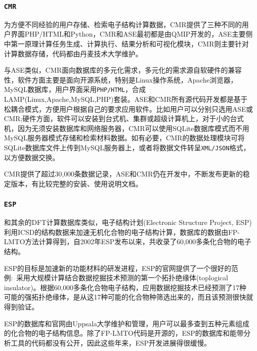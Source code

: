 \frame
{
\frametitle{\tt{CMR}}
为方便不同经验的用户存储、检索电子结构计算数据，\textrm{CMR}提供了三种不同的用户界面\textrm{PHP/HTML和Python}\cite{CMR_URL}，\textrm{CMR}和\textrm{ASE}最初都是由\textrm{QMIP}开发的\cite{CSE14-51_2012}，\textrm{ASE}主要侧中第一原理计算任务生成、计算执行、结果分析和可视化模块，\textrm{CMR}则主要针对计算数据存储，代码都由丹麦技术大学维护。

与\textrm{ASE}类似，\textrm{CMR}面向数据库的多元化需求，多元化的需求源自软硬件的兼容性，软件方面主要是面向开源系统，特别是\textrm{Linux}操作系统，\textrm{Apache}浏览器，\textrm{MySQL}数据库，用户界面采用\texttt{PHP/HTML}，合成\textrm{LAMP}(\textrm{Linux,Apache,MySQL,PHP})套装。\textrm{ASE}和\textrm{CMR}所有源代码开发都是基于松耦合模式，方便用户根据自己的要求应用软件。比如用户可以分别只选用\textrm{ASE}或\textrm{CMR};硬件方面，软件可以安装到台式机、集群或超级计算机上，对于小的台式机，因为无须安装数据库和网络服务器，\textrm{CMR}可以使用\textrm{SQLite}数据库模式而不用\textrm{MySQL}服务器模式存储和检索材料数据。如有必要，\textrm{CMR}的数据处理模块可将\textrm{SQLite}数据库文件上传到\textrm{MySQL}服务器上，或者将数据文件转呈\texttt{XML/JSON}格式，以方便数据交换。

\textrm{CMR}提供了超过30,000条数据记录，\textrm{ASE}和\textrm{CMR}仍在开发中，不断发布更新的稳定版本，有比较完整的安装、使用说明文档。
}

\frame
{
\frametitle{\tt{ESP}}
和其余的\textrm{DFT}计算数据库类似，电子结构计划\textrm{(Electronic Structure Project, ESP)}利用\textrm{ICSD}的结构数据来加速无机化合物的电子结构计算\cite{ESP_URL,CMS44-1042_2009}，数据库的数据由\textrm{FP-LMTO}方法计算得到，自2002年\textrm{ESP}发布以来，共收录了60,000多条化合物的电子结构。

\textrm{ESP}的目标是加速新的功能材料的研发进程，\textrm{ESP}的官网提供了一个很好的范例:~采用大规模计算结合数据挖掘技术预测的第一个拓扑绝缘体\textrm{(toplogical insulator)}。根据60,000多条化合物电子结构，应用数据挖掘技术已经预测了17种可能的强拓扑绝缘体\cite{arXiv1007-4838_2010,APR6-31_2014}，是从这17种可能的化合物种筛选出来的，而且该预测很快就得到验证。

\textrm{ESP}的数据库和官网由\textrm{Uppsala}大学维护和管理，用户可以最多查到五种元素组成的化合物的电子结构信息。除了\textrm{FP-LMTO}代码是开源的，\textrm{ESP}的数据库和能带分析工具的代码都没有公开，因此这些年来，\textrm{ESP}开发进展得很缓慢。
}


